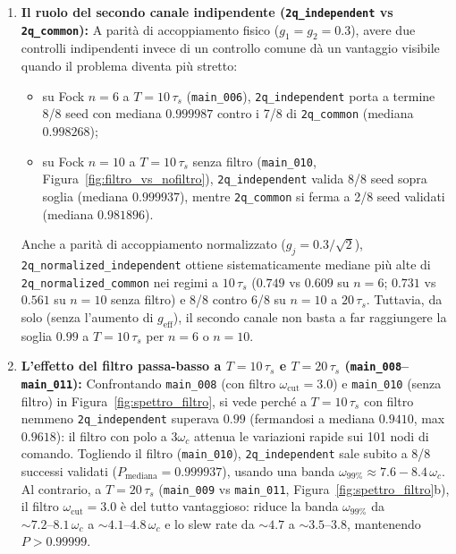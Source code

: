 \documentclass[11pt,a4paper]{article}
\begin{document}
\begin{enumerate}
    \item \textbf{Il ruolo del secondo canale indipendente (\texttt{2q\_independent} vs \texttt{2q\_common}):}
    A parità di accoppiamento fisico ($g_1=g_2=0.3$), avere due controlli indipendenti invece di un controllo comune dà un vantaggio visibile quando il problema diventa più stretto:
    \begin{itemize}
        \item su Fock $n=6$ a $T=10\,\tau_s$ (\texttt{main\_006}), \texttt{2q\_independent} porta a termine 8/8 seed con mediana $0.999987$ contro i 7/8 di \texttt{2q\_common} (mediana $0.998268$);
        \item su Fock $n=10$ a $T=10\,\tau_s$ senza filtro (\texttt{main\_010}, Figura~\ref{fig:filtro_vs_nofiltro}), \texttt{2q\_independent} valida 8/8 seed sopra soglia (mediana $0.999937$), mentre \texttt{2q\_common} si ferma a 2/8 seed validati (mediana $0.981896$).
    \end{itemize}
    Anche a parità di accoppiamento normalizzato ($g_j = 0.3/\sqrt{2}$), \texttt{2q\_normalized\_independent} ottiene sistematicamente mediane più alte di \texttt{2q\_normalized\_common} nei regimi a $10\,\tau_s$ ($0.749$ vs $0.609$ su $n=6$; $0.731$ vs $0.561$ su $n=10$ senza filtro) e 8/8 contro 6/8 su $n=10$ a $20\,\tau_s$. Tuttavia, da solo (senza l'aumento di $g_{\text{eff}}$), il secondo canale non basta a far raggiungere la soglia $0.99$ a $T=10\,\tau_s$ per $n=6$ o $n=10$.

    \item \textbf{L'effetto del filtro passa-basso a $T = 10\,\tau_s$ e $T = 20\,\tau_s$ (\texttt{main\_008}--\texttt{main\_011}):}
    Confrontando \texttt{main\_008} (con filtro $\omega_{\text{cut}}=3.0$) e \texttt{main\_010} (senza filtro) in Figura~\ref{fig:spettro_filtro}, si vede perché a $T=10\,\tau_s$ con filtro nemmeno \texttt{2q\_independent} superava $0.99$ (fermandosi a mediana $0.9410$, max $0.9618$): il filtro con polo a $3\omega_c$ attenua le variazioni rapide sui 101 nodi di comando. Togliendo il filtro (\texttt{main\_010}), \texttt{2q\_independent} sale subito a 8/8 successi validati ($P_{\text{mediana}} = 0.999937$), usando una banda $\omega_{99\%} \approx 7.6 - 8.4\,\omega_c$. Al contrario, a $T=20\,\tau_s$ (\texttt{main\_009} vs \texttt{main\_011}, Figura~\ref{fig:spettro_filtro}b), il filtro $\omega_{\text{cut}}=3.0$ è del tutto vantaggioso: riduce la banda $\omega_{99\%}$ da $\sim 7.2\text{--}8.1\,\omega_c$ a $\sim 4.1\text{--}4.8\,\omega_c$ e lo slew rate da $\sim 4.7$ a $\sim 3.5\text{--}3.8$, mantenendo $P > 0.99999$.


\end{enumerate}
\end{document}
